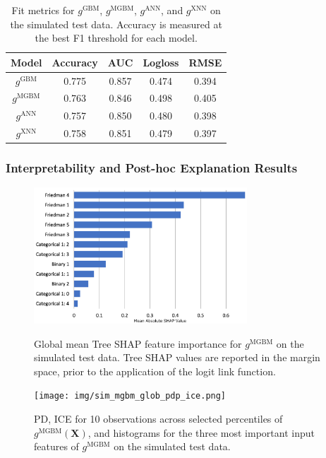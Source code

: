 \documentclass[information,article,submit,moreauthors,pdftex]{definitions/mdpi}
\begin{document}
\begin{table}[H]
\label{tab:sim_acc}
\caption{Fit metrics for $g^\text{GBM}$, $g^\text{MGBM}$, $g^\text{ANN}$, and $g^\text{XNN}$ on the simulated test data. Accuracy is measured at the best F1 threshold for each model.}
\centering
\begin{tabular}{ccccc}
\toprule
\textbf{Model}		& \textbf{Accuracy}	& \textbf{AUC}	 & \textbf{Logloss}	& \textbf{RMSE}\\
\midrule
$g^\text{GBM}$		& 0.775	& 0.857	& 0.474	& 0.394 \\
$g^\text{MGBM}$	& 0.763	& 0.846	& 0.498	& 0.405 \\
$g^\text{ANN}$		& 0.757	& 0.850	& 0.480 	& 0.398 \\
$g^\text{XNN}$		& 0.758	& 0.851	& 0.479	& 0.397 \\
\bottomrule
\end{tabular}
\end{table}

\subsubsection{Interpretability and Post-hoc Explanation Results}

\begin{figure}[H]
\centering
\includegraphics[width=8cm]{img/sim_mgbm_glob.png}
\label{fig:sim_mgbm_glob}
\caption{Global mean Tree SHAP feature importance for $g^\text{MGBM}$ on the simulated test data. Tree SHAP values are reported in the margin space, prior to the application of the logit link function.}
\end{figure}   

\begin{figure}[H]
\centering
\texttt{[image: img/sim\_mgbm\_glob\_pdp\_ice.png]}
\label{fig:sim_mgbm_glob_pdp_ice}
\caption{PD, ICE for 10 observations across selected percentiles of $g^\text{MGBM}(\mathbf{X})$, and histograms for the three most important input features of $g^\text{MGBM}$ on the simulated test data.}
\end{figure}   
\end{document}

